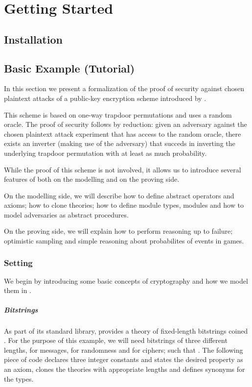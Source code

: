 
\chapter{Getting Started}
\section{Installation}

\section{Basic Example (Tutorial)\label{sec:tutorial}}
In this section we present a formalization of the proof of security
against chosen plaintext attacks of a public-key encryption scheme
introduced by \citet{br93}.

This scheme is based on one-way trapdoor permutations and uses a
random oracle. The proof of security follows by reduction: given an
adversary against the chosen plaintext attack experiment that has
access to the random oracle, there exists an inverter (making use of
the adversary) that succeds in inverting the underlying trapdoor
permutation with at least as much probability.

While the proof of this scheme is not involved, it allows us to
introduce several features of \EC both on the modelling and on
the proving side.

On the modelling side, we will describe how to define abstract operators
and axioms; how to clone theories; how to define module types, modules
and how to model adversaries as abstract procedures.

On the proving side, we will explain how to perform reasoning up to
failure; optimistic sampling and simple reasoning about probabilites
of events in games.

\subsection{Setting}
We begin by introducing some basic concepts of cryptography and how we
model them in \EC.

\paragraph{Bitstrings}
As part of its standard library, \EC provides a theory of fixed-length
bitstrings coined . For the purpose of this example, we will
need bitstrings of three different lengths,  for messages, 
for randomness and  for ciphers; such that . The
following piece of code declares three integer constants and states
the desired property as an axiom, clones the theories with appropriate
lengths and defines synonyms for the types.

